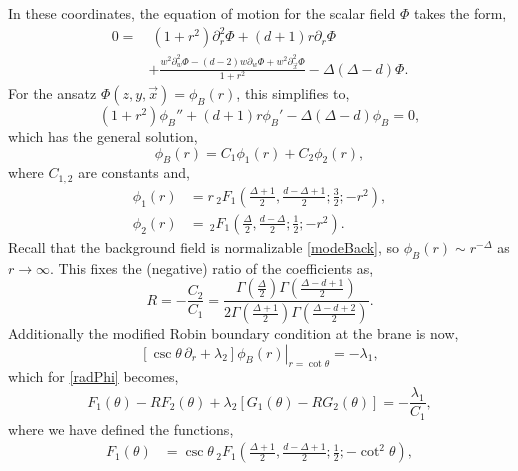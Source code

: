 \documentclass[reprint,amsmath,amssymb,aps,nofootinbib,twocolumn]{revtex4-2}
\begin{document}
\begin{appendix}
In these coordinates, the equation of motion for the scalar field $\Phi$ takes the form,
\begin{equation}
\begin{split}
0 =&\ (1 + r^2)\partial_r^2 \Phi + (d+1)r\partial_r \Phi\\
&+ \frac{w^2 \partial_w^2 \Phi - (d-2)w\partial_w \Phi + w^2 \partial_{\vec{x}}^2 \Phi}{1 + r^2} - \Delta(\Delta - d)\Phi.
\end{split}
\end{equation}
For the ansatz $\Phi(z,y,\vec{x}) = \phi_B(r)$, this simplifies to,
\begin{equation}
(1 + r^2)\phi_B'' + (d+1)r\phi_B' - \Delta(\Delta - d)\phi_B = 0,
\end{equation}
which has the general solution,
\begin{equation}
\phi_B(r) = C_1 \phi_1(r) + C_2 \phi_2(r),\label{radPhi}
\end{equation}
where $C_{1,2}$ are constants and,
\begin{align}
\phi_1(r) &= r\,_2F_1\left(\frac{\Delta + 1}{2},\frac{d-\Delta + 1}{2};\frac{3}{2};-r^2\right),\\
\phi_2(r) &=\,\!_2F_1\left(\frac{\Delta}{2},\frac{d-\Delta}{2};\frac{1}{2};-r^2\right).
\end{align}
Recall that the background field is normalizable \eqref{modeBack}, so $\phi_B(r) \sim r^{-\Delta}$ as $r \to \infty$. This fixes the (negative) ratio of the coefficients as,
\begin{equation}
R = -\frac{C_2}{C_1} = \frac{\Gamma\left(\frac{\Delta}{2}\right)\Gamma\left(\frac{\Delta - d + 1}{2}\right)}{2\Gamma\left(\frac{\Delta + 1}{2}\right)\Gamma\left(\frac{\Delta - d + 2}{2}\right)}.\label{ratio12}
\end{equation}
Additionally the modified Robin boundary condition at the brane is now,
\begin{equation}
\left.\left[\csc\theta\,\partial_r + \lambda_2\right]\phi_B(r) \right|_{r = \cot\theta} = -\lambda_1,
\end{equation}
which for \eqref{radPhi} becomes,
\begin{equation}
F_1(\theta) - RF_2(\theta) + \lambda_2\left[G_1(\theta) - RG_2(\theta)\right] = -\frac{\lambda_1}{C_1},
\end{equation}
where we have defined the functions,%
\begin{align}
F_1(\theta)
&= \csc\theta\,_2F_1\left(\frac{\Delta + 1}{2},\frac{d-\Delta + 1}{2};\frac{1}{2};-\cot^2\theta\right),\\

\end{align}
\end{appendix}
\end{document}
